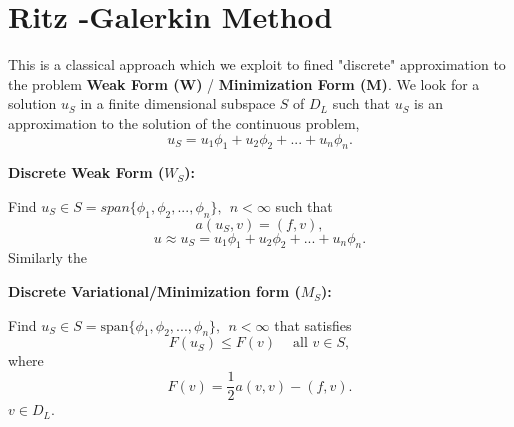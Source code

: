 \section{Ritz -Galerkin Method}
This is a classical approach which we exploit to fined "discrete" approximation to
the problem \textbf{Weak Form (W)} / \textbf{Minimization Form (M)}. We look for a solution $u_S$ in a finite
dimensional subspace $S $ of $D_L$ such that $u_S$ is an approximation to the solution of the continuous problem,\\
\[u_S=u_1\phi_1+u_2\phi_2 + ...+u_n\phi_n. \]
\begin{center}
    \textbf{Discrete Weak Form ($W_S$):}\\
\end{center} Find $u_{S} \in S = span\{\phi_1,\phi_2,...,\phi_n \}, \ \ n< \infty$ such that
\[a(u_S,v)=(f,v),\]
\[u\approx u_S=u_1\phi_1+u_2\phi_2 + ...+u_n\phi_n. \]
Similarly the 
\begin{center}
\textbf{Discrete Variational/Minimization form ($M_S$):} \\   
\end{center}
Find $u_{S} \in S = \text{span}\{\phi_1,\phi_2,...,\phi_n \}, \ \ n< \infty$ that satisfies
\[F(u_S) \leq F(v) \ \ \ \ \mbox{ all } v\in S,\]
where
\[F(v)=\frac{1}{2}a(v,v)-(f,v).\]
$v \in D_L$.

